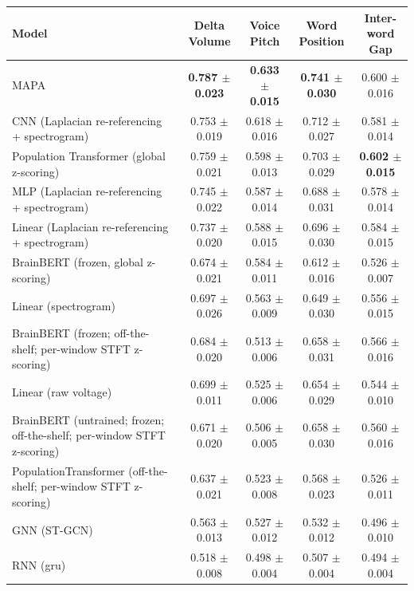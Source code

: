 \begin{table}[!htbp]
\hspace{1em}
\hspace*{-2.5cm}\begin{tabular}{>{\raggedright\arraybackslash}p{8cm}cccc}
\hline
Model & Delta Volume & Voice Pitch & Word Position & Inter-word Gap \\
\hline
MAPA & \textbf{0.787 $\pm$ 0.023} & \textbf{0.633 $\pm$ 0.015} & \textbf{0.741 $\pm$ 0.030} & 0.600 $\pm$ 0.016 \\
CNN (Laplacian re-referencing + spectrogram) & 0.753 $\pm$ 0.019 & 0.618 $\pm$ 0.016 & 0.712 $\pm$ 0.027 & 0.581 $\pm$ 0.014 \\
Population Transformer (global z-scoring) & 0.759 $\pm$ 0.021 & 0.598 $\pm$ 0.013 & 0.703 $\pm$ 0.029 & \textbf{0.602 $\pm$ 0.015} \\
MLP (Laplacian re-referencing + spectrogram) & 0.745 $\pm$ 0.022 & 0.587 $\pm$ 0.014 & 0.688 $\pm$ 0.031 & 0.578 $\pm$ 0.014 \\
Linear (Laplacian re-referencing + spectrogram) & 0.737 $\pm$ 0.020 & 0.588 $\pm$ 0.015 & 0.696 $\pm$ 0.030 & 0.584 $\pm$ 0.015 \\
BrainBERT (frozen, global z-scoring) & 0.674 $\pm$ 0.021 & 0.584 $\pm$ 0.011 & 0.612 $\pm$ 0.016 & 0.526 $\pm$ 0.007 \\
Linear (spectrogram) & 0.697 $\pm$ 0.026 & 0.563 $\pm$ 0.009 & 0.649 $\pm$ 0.030 & 0.556 $\pm$ 0.015 \\
BrainBERT (frozen; off-the-shelf; per-window STFT z-scoring) & 0.684 $\pm$ 0.020 & 0.513 $\pm$ 0.006 & 0.658 $\pm$ 0.031 & 0.566 $\pm$ 0.016 \\
Linear (raw voltage) & 0.699 $\pm$ 0.011 & 0.525 $\pm$ 0.006 & 0.654 $\pm$ 0.029 & 0.544 $\pm$ 0.010 \\
BrainBERT (untrained; frozen; off-the-shelf; per-window STFT z-scoring) & 0.671 $\pm$ 0.020 & 0.506 $\pm$ 0.005 & 0.658 $\pm$ 0.030 & 0.560 $\pm$ 0.016 \\
PopulationTransformer (off-the-shelf; per-window STFT z-scoring) & 0.637 $\pm$ 0.021 & 0.523 $\pm$ 0.008 & 0.568 $\pm$ 0.023 & 0.526 $\pm$ 0.011 \\
GNN (ST-GCN) & 0.563 $\pm$ 0.013 & 0.527 $\pm$ 0.012 & 0.532 $\pm$ 0.012 & 0.496 $\pm$ 0.010 \\
RNN (gru) & 0.518 $\pm$ 0.008 & 0.498 $\pm$ 0.004 & 0.507 $\pm$ 0.004 & 0.494 $\pm$ 0.004 \\
\hline
\end{tabular}
\hspace{1em}
\hspace*{-2.5cm}\begin{tabular}{>{\raggedright\arraybackslash}p{8cm}cccc}

\end{tabular}
\end{table}
